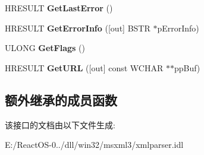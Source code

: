 \begin{DoxyCompactItemize}
\item 
\mbox{\label{interface_x_m_l_p_s_r_1_1_i_x_m_l_node_source_a819437c6ab64685cd9650dd6e783672f}} 
H\+R\+E\+S\+U\+LT {\bfseries Get\+Last\+Error} ()
\item 
\mbox{\label{interface_x_m_l_p_s_r_1_1_i_x_m_l_node_source_a1d2ef575315dc24e845a23ae1a2c9160}} 
H\+R\+E\+S\+U\+LT {\bfseries Get\+Error\+Info} (\mbox{[}out\mbox{]} B\+S\+TR $\ast$p\+Error\+Info)
\item 
\mbox{\label{interface_x_m_l_p_s_r_1_1_i_x_m_l_node_source_acae4657cb13c5be01cd0aa8012a6a8a3}} 
U\+L\+O\+NG {\bfseries Get\+Flags} ()
\item 
\mbox{\label{interface_x_m_l_p_s_r_1_1_i_x_m_l_node_source_aafacfc29bba6f3c7561d4d7f8b328a70}} 
H\+R\+E\+S\+U\+LT {\bfseries Get\+U\+RL} (\mbox{[}out\mbox{]} const W\+C\+H\+AR $\ast$$\ast$pp\+Buf)
\end{DoxyCompactItemize}
\subsection*{额外继承的成员函数}


该接口的文档由以下文件生成\+:\begin{DoxyCompactItemize}
\item 
E\+:/\+React\+O\+S-\/0../dll/win32/msxml3/xmlparser.\+idl\end{DoxyCompactItemize}

